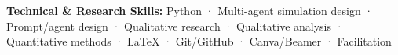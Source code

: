 \documentclass[9pt, a4paper]{academic-cv}
\begin{document}
\makecvheader
\makecvfooter
  {\textbf{Technical \& Research Skills:} Python · Multi-agent simulation design · Prompt/agent design · Qualitative research · Qualitative analysis · Quantitative methods · LaTeX · Git/GitHub · Canva/Beamer · Facilitation}
  {} %
  {} %











\end{document}
